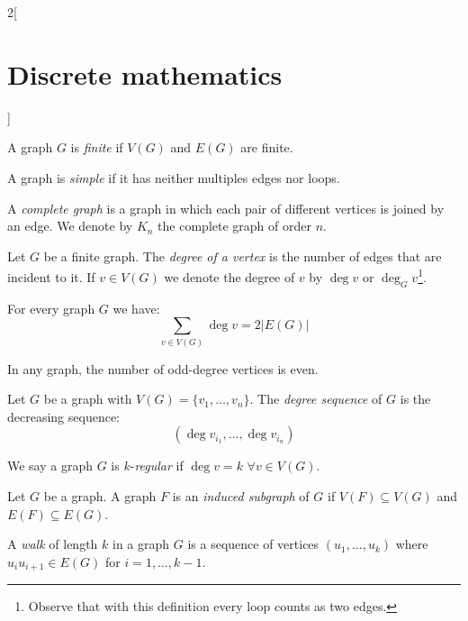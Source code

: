 \documentclass[../../../main_math.tex]{subfiles}
\begin{document}
\begin{multicols}{2}[\section{Discrete mathematics}]
  \begin{definition}
    A graph $G$ is \emph{finite} if $V(G)$ and $E(G)$ are finite.
  \end{definition}
  \begin{definition}
    A graph is \emph{simple} if it has neither multiples edges nor loops.
  \end{definition}
  \begin{definition}
    A \emph{complete graph} is a graph in which each pair of different vertices is joined by an edge. We denote by $K_n$ the complete graph of order $n$.
  \end{definition}
  \begin{center}
    \begin{minipage}{\linewidth}
      \centering
      
    \end{minipage}
  \end{center}
  \begin{definition}
    Let $G$ be a finite graph. The \emph{degree of a vertex} is the number of edges that are incident to it. If $v\in V(G)$ we denote the degree of $v$ by $\deg v$ or $\deg_Gv$\footnote{Observe that with this definition every loop counts as two edges.}.
  \end{definition}
  \begin{lemma}
    For every graph $G$ we have: $$\sum_{v\in V(G)}\deg v=2|E(G)|$$
  \end{lemma}
  \begin{corollary}
    In any graph, the number of odd-degree vertices is even.
  \end{corollary}
  \begin{definition}
    Let $G$ be a graph with $V(G)=\{v_1,\ldots,v_n\}$. The \emph{degree sequence} of $G$ is the decreasing sequence: $$(\deg v_{i_1},\ldots,\deg v_{i_n})$$
  \end{definition}
  \begin{definition}
    We say a graph $G$ is $k$-\emph{regular} if $\deg v=k$ $\forall v\in V(G)$.
  \end{definition}
  \begin{definition}
    Let $G$ be a graph. A graph $F$ is an \emph{induced subgraph} of $G$ if $V(F)\subseteq V(G)$ and $E(F)\subseteq E(G)$.
  \end{definition}
  \begin{definition}
    A \emph{walk} of length $k$ in a graph $G$ is a sequence of vertices $(u_1,\ldots,u_k)$ where $u_iu_{i+1}\in E(G)$ for $i=1,\ldots,k-1$.

\end{definition}
\end{multicols}
\end{document}
